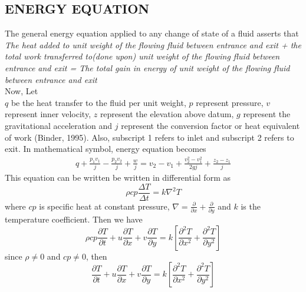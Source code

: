 \documentclass[11pt]{report}
\newcommand{\sps}{\\[0.2cm]}
\newcommand{\dsp}{\displaystyle}
\begin{document}
	\subsection{ENERGY EQUATION}
	The general energy equation applied to any change of state of a fluid asserts that\\
	\textit{The heat added to unit weight of the flowing fluid between entrance and exit + the total work transferred to(done upon) unit weight of the flowing fluid between entrance and exit = The total gain in energy of unit weight of the flowing fluid between entrance and exit}\sps
	Now, Let\\
	$q$ be the heat transfer to the fluid per unit weight, $p$ represent pressure, $v$ represent inner velocity, $z$ represent the elevation above datum, $g$ represent the gravitational acceleration and $j$ represent the conversion factor or heat equivalent of work (Binder, 1995). Also, subscript 1 refers to inlet and subscript 2 refers to exit. In mathematical symbol, energy equation becomes
	\begin{eqnarray}
		q + \frac{p_1v_1}{j} - \frac{p_2v_2}{j} + \frac{w}{j} = v_2-v_1+\frac{v_2^2 - v_1^2}{2gj} + \frac{z_2 - z_1}{j}
	\end{eqnarray}
	This equation can be written be written in differential form as
	\begin{equation}
		\rho cp\frac{\Delta T}{\Delta t} = k\nabla^2 T
	\end{equation}
	where $cp$ is specific heat at constant pressure, $\dsp\nabla = \frac{\partial}{\partial x} + \frac{\partial}{\partial y}$ and $k$ is the temperature coefficient. Then we have
	\begin{equation}
		\rho cp\frac{\partial T}{\partial t} + u\frac{\partial T}{\partial x} + v\frac{\partial T}{\partial y} = k\left[\frac{\partial^2 T}{\partial x^2} + \frac{\partial^2 T}{\partial y^2}\right]
	\end{equation}
	since $\rho \neq 0$ and $cp\neq 0$, then
	\begin{equation}
		\frac{\partial T}{\partial t} + u\frac{\partial T}{\partial x}+ v \frac{\partial T}{\partial y} = k\left[\frac{\partial^2 T}{\partial x^2} + \frac{\partial^2 T}{\partial y^2}\right]
	\end{equation}
\end{document}
